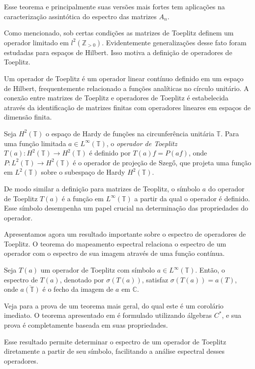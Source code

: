 Esse teorema e principalmente suas versões mais fortes tem aplicações na caracterização assintótica do espectro das matrizes $A_n$.

Como mencionado, sob certas condições as matrizes de Toeplitz definem um operador limitado em $l^2(\mathbb{Z}_{> 0})$. Evidentemente generalizações desse fato foram estudadas para espaços de Hilbert. Isso motiva a definição de operadores de Toeplitz.

Um operador de Toeplitz é um operador linear contínuo definido em um espaço de Hilbert, frequentemente relacionado a funções analíticas no círculo unitário. A conexão entre matrizes de Toeplitz e operadores de Toeplitz é estabelecida através da identificação de matrizes finitas com operadores lineares em espaços de dimensão finita.
\begin{definition*}
  Seja $H^2(\mathbb{T})$ o espaço de Hardy de funções na circunferência unitária $\mathbb{T}$. Para uma função limitada $a \in L^\infty(\mathbb{T})$, o \textit{operador de Toeplitz} $T(a) : H^2(\mathbb{T}) \to H^2(\mathbb{T})$ é definido por $T(a)f=P(af)$, onde $P : L^2(\mathbb{T}) \to H^2(\mathbb{T})$ é o operador de projeção de Szegő, que projeta uma função em $L^2(\mathbb{T})$ sobre o subespaço de Hardy $H^2(\mathbb{T})$.
\end{definition*}
De modo similar a definição para matrizes de Teoplitz, o símbolo $a$ do operador de Toeplitz $T(a)$ é a função em $L^\infty(\mathbb{T})$ a partir da qual o operador é definido. Esse símbolo desempenha um papel crucial na determinação das propriedades do operador.

Apresentamos agora um resultado importante sobre o espectro de operadores de Toeplitz. O teorema do mapeamento espectral relaciona o espectro de um operador com o espectro de sua imagem através de uma função contínua.
\begin{theorem*}
  Seja $T(a)$ um operador de Toeplitz com símbolo $a \in L^\infty(\mathbb{T})$. Então, o espectro de $T(a)$, denotado por $\sigma(T(a))$, satisfaz $\sigma(T(a))=a(T)$, onde $\overline{a(\mathbb{T})}$ é o fecho da imagem de $a$ em $\mathbb{C}$.
\end{theorem*}

Veja \cite[p. 85]{Douglas1998} para a prova de um teorema mais geral, do qual este é um corolário imediato. O teorema apresentado em \cite{Douglas1998} é formulado utilizando álgebras $C^\ast$, e sua prova é completamente baseada em suas propriedades.

Esse resultado permite determinar o espectro de um operador de Toeplitz diretamente a partir de seu símbolo, facilitando a análise espectral desses operadores.

